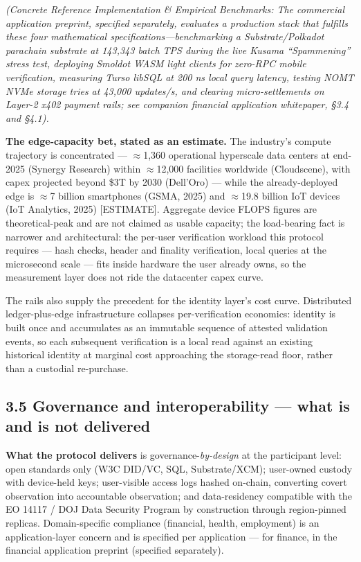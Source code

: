 \documentclass[
]{article}
\begin{document}
\emph{(Concrete Reference Implementation \& Empirical Benchmarks: The
commercial application preprint, specified separately, evaluates a
production stack that fulfills these four mathematical
specifications---benchmarking a Substrate/Polkadot parachain substrate
at 143,343 batch TPS during the live Kusama ``Spammening'' stress test,
deploying Smoldot WASM light clients for zero-RPC mobile verification,
measuring Turso libSQL at 200 ns local query latency, testing NOMT NVMe
storage tries at 43,000 updates/s, and clearing micro-settlements on
Layer-2 x402 payment rails; see companion financial application
whitepaper, §3.4 and §4.1).}

\textbf{The edge-capacity bet, stated as an estimate.} The industry's
compute trajectory is concentrated --- \(\approx\)1,360 operational
hyperscale data centers at end-2025 (Synergy Research) within
\(\approx\)12,000 facilities worldwide (Cloudscene), with capex
projected beyond \$3T by 2030 (Dell'Oro) --- while the already-deployed
edge is \(\approx\)7 billion smartphones (GSMA, 2025) and
\(\approx\)19.8 billion IoT devices (IoT Analytics, 2025)
{[}ESTIMATE{]}. Aggregate device FLOPS figures are theoretical-peak and
are not claimed as usable capacity; the load-bearing fact is narrower
and architectural: the per-user verification workload this protocol
requires --- hash checks, header and finality verification, local
queries at the microsecond scale --- fits inside hardware the user
already owns, so the measurement layer does not ride the datacenter
capex curve.

The rails also supply the precedent for the identity layer's cost curve.
Distributed ledger-plus-edge infrastructure collapses per-verification
economics: identity is built once and accumulates as an immutable
sequence of attested validation events, so each subsequent verification
is a local read against an existing historical identity at marginal cost
approaching the storage-read floor, rather than a custodial re-purchase.

\subsection{3.5 Governance and interoperability --- what is and is not
delivered}\label{governance-and-interoperability-what-is-and-is-not-delivered}

\textbf{What the protocol delivers} is governance-\emph{by-design} at
the participant level: open standards only (W3C DID/VC, SQL,
Substrate/XCM); user-owned custody with device-held keys; user-visible
access logs hashed on-chain, converting covert observation into
accountable observation; and data-residency compatible with the EO 14117
/ DOJ Data Security Program by construction through region-pinned
replicas. Domain-specific compliance (financial, health, employment) is
an application-layer concern and is specified per application --- for
finance, in the financial application preprint (specified separately).
\end{document}
